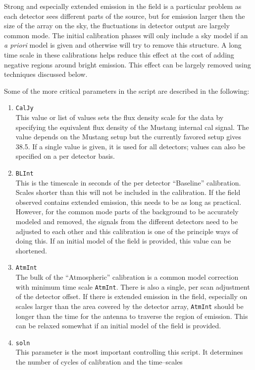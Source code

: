 \documentclass[11pt]{report}
\begin{document}
Strong and especially extended emission in the field is a particular
problem as each detector sees different parts of the source, but for
emission larger then the size of the array on the sky, the fluctuations
in detector output are largely common mode.
The initial calibration phases will only include a sky model if an
{\it a priori} model is given and otherwise will try to remove this
structure. 
A long time scale in these calibrations helps reduce this effect at
the cost of adding negative regions around bright emission.
This effect can be largely removed using techniques discussed below.

Some of the more critical parameters in the script are described in
the following: 
\begin{enumerate}
\item {\tt CalJy}  \\
This value or list of values sets the flux density scale for the
data by specifying the equivalent flux density of the Mustang internal
cal signal.
The value depends on the Mustang setup but the currently favored setup
gives 38.5.
If a single value is given, it is used for all detectors; values can
also be specified on a per detector basis.
\item {\tt BLInt}\\
This is the timescale in seconds of the per detector ``Baseline''
calibration.
Scales shorter than this will not be included in the calibration.
If the field observed contains extended emission, this needs to be as
long as practical.
However, for the common mode parts of the background to be accurately
modeled and removed, the signals from the different detectors need to
be adjusted to each other and this calibration is one of the principle
ways of doing this.
If an initial model of the field is provided, this value can be shortened.
\item {\tt AtmInt}\\
The bulk of the ``Atmospheric'' calibration is a common model
correction with minimum time scale {\tt AtmInt}.  
There is also a single, per scan adjustment of the detector offset.
If there is extended emission in the field, especially on scales
larger than the area covered by the detector array, {\tt AtmInt} should
be longer than the time for the antenna to traverse the region of
emission.
This can be relaxed somewhat if an initial model of the field is provided.
\item {\tt soln} \\
This parameter is the most important controlling this script.
It determines the number of cycles of calibration and the time--scales

\end{enumerate}
\end{document}
